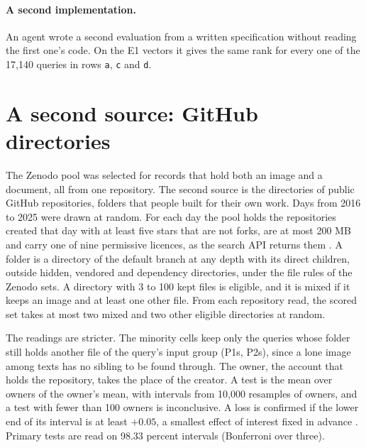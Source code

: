 \documentclass[sigconf,natbib=true,anonymous=true]{acmart}
\newcommand{\rep}[1]{\texttt{#1}}
\begin{document}
\paragraph{A second implementation.} An agent wrote a second evaluation from a written specification without reading the first one's code. On the E1 vectors it gives the same rank for every one of the 17,140 queries in rows \rep{a}, \rep{c} and \rep{d}.

\section{A second source: GitHub directories}
\label{sec:github}

The Zenodo pool was selected for records that hold both an image and a document, all from one repository. The second source is the directories of public GitHub repositories, folders that people built for their own work. Days from 2016 to 2025 were drawn at random. For each day the pool holds the repositories created that day with at least five stars that are not forks, are at most 200 MB and carry one of nine permissive licences, as the search API returns them \citep{github2026search}. A folder is a directory of the default branch at any depth with its direct children, outside hidden, vendored and dependency directories, under the file rules of the Zenodo sets. A directory with 3 to 100 kept files is eligible, and it is mixed if it keeps an image and at least one other file. From each repository read, the scored set takes at most two mixed and two other eligible directories at random.

The readings are stricter. The minority cells keep only the queries whose folder still holds another file of the query's input group (P1s, P2s), since a lone image among texts has no sibling to be found through. The owner, the account that holds the repository, takes the place of the creator. A test is the mean over owners of the owner's mean, with intervals from 10,000 resamples of owners, and a test with fewer than 100 owners is inconclusive. A loss is confirmed if the lower end of its interval is at least $+0.05$, a smallest effect of interest fixed in advance \citep{lakens2018equivalence}. Primary tests are read on 98.33 percent intervals (Bonferroni over three).
\end{document}
